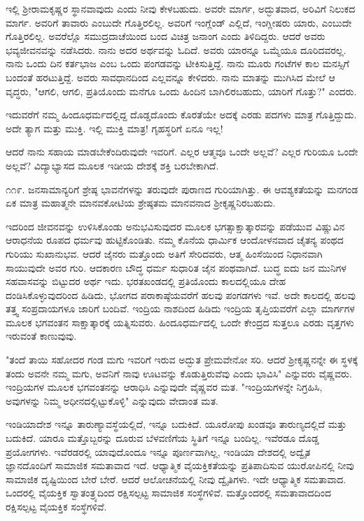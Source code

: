 ಇಲ್ಲಿ ಶ‍್ರೀರಾಮಕೃಷ್ಣರ ಸ್ಥಾನವಾವುದು ಎಂದು ನೀವು ಕೇಳಬಹುದು. ಅವರೇ ಮಾರ್ಗ, ಅದ್ಭುತವಾದ, ಅರಿವಿಗೆ ನಿಲುಕದ ಮಾರ್ಗ. ಅವರಿಗೆ ತಾವಾರು ಎಂಬುದೇ ಗೊತ್ತಿರಲಿಲ್ಲ. ಅವರಿಗೆ ಇಂಗ್ಲೆಂಡ್ ಎಲ್ಲಿದೆ, ಇಂಗ್ಲೀಷರು ಯಾರು, ಎಂಬುದೇ ಗೊತ್ತಿರಲಿಲ್ಲ. ಅವರೆಲ್ಲೊ ಸಮುದ್ರದಾಚೆಯಿಂದ ಬಂದ ವಿಚಿತ್ರ ಜನಾಂಗ ಎಂದು ತಿಳಿದಿದ್ದರು. ಆದರೆ ಅವರು ಭವ್ಯಜೀವನವನ್ನು ನಡೆಸಿದರು. ನಾನು ಅದರ ಅರ್ಥವನ್ನು ಓದಿದೆ. ಅವರು ಯಾರನ್ನೂ ಒಮ್ಮೆಯೂ ದೂರಿದವರಲ್ಲ. ನಾನು ಒಂದು ದಿನ ಕರ್ತಭಾಜ ಎಂಬ ಒಂದು ಪಂಗಡವನ್ನು ಟೀಕಿಸುತ್ತಿದ್ದೆ. ನಾನು ಮೂರು ಗಂಟೆಗಳ ಕಾಲ ಮನಸ್ಸಿಗೆ ಬಂದಂತೆ ಹರಟುತ್ತಿದ್ದೆ. ಅವರು ಸಾವಧಾನದಿಂದ ಎಲ್ಲವನ್ನೂ ಕೇಳಿದರು. ನಾನು ಮಾತನ್ನು ಮುಗಿಸಿದ ಮೇಲೆ ಆ ವೃದ್ಧರು, "ಆಗಲಿ, ಆಗಲಿ, ಪ್ರತಿಯೊಂದು ಮನೆಗೂ ಒಂದು ಹಿಂದಿನ ಬಾಗಿಲಿರಬಹುದು, ಯಾರಿಗೆ ಗೊತ್ತು?" ಎಂದರು.

ಇದುವರೆಗೆ ನಮ್ಮ ಹಿಂದೂಧರ್ಮದಲ್ಲಿದ್ದ ದೊಡ್ಡದೊಂದು ಕೊರತೆಯೇ ಅದಕ್ಕೆ ಎರಡು ಪದಗಳು ಮಾತ್ರ ಗೊತ್ತಿದ್ದುದು. ಅದೇ ತ್ಯಾಗ ಮತ್ತು ಮುಕ್ತಿ. ಇಲ್ಲಿ ಮುಕ್ತಿ ಮಾತ್ರ! ಗೃಹಸ್ಥರಿಗೆ ಏನೂ ಇಲ್ಲ!

ಆದರೆ ನಾನು ಸಹಾಯ ಮಾಡಬೇಕೆಂದಿರುವುದೇ ಇವರಿಗೆ. ಎಲ್ಲರ ಆತ್ಮವೂ ಒಂದೇ ಅಲ್ಲವೆ? ಎಲ್ಲರ ಗುರಿಯೂ ಒಂದೇ ಅಲ್ಲವೆ? ವಿದ್ಯಾಭ್ಯಾಸದ ಮೂಲಕ ಇಡೀಯ ದೇಶಕ್ಕೆ ಶಕ್ತಿ ಬರಬೇಕಾಗಿದೆ.

೧೧೯. ಜನಸಾಮಾನ್ಯರಿಗೆ ಶ್ರೇಷ್ಠ ಭಾವನೆಗಳನ್ನು ತರುವುದೇ ಪುರಾಣದ ಗುರಿಯಾಗಿತ್ತು. ಈ ಆವಶ್ಯಕತೆಯನ್ನು ಮನಗಂಡ ಏಕ ಮಾತ್ರ ಮಹಾತ್ಮನೇ ಮಾನವಕೋಟಿಯ ಶ್ರೇಷ್ಠತಮ ಮಾನವನಾದ ಶ‍್ರೀಕೃಷ್ಣನಿರಬಹುದು.

ಇದರಿಂದ ಜೀವನವನ್ನು ಉಳಿಸಿಕೊಂಡು ಅನುಭವಿಸುವುದರ ಮೂಲಕ ಭಗತ್ಸಾಕ್ಷಾತ್ಕಾರವನ್ನು ಪಡೆಯುವ ವಿಷ್ಣುವಿನ ಆರಾಧನೆಯ ರೂಪದ ಧರ್ಮವು ಹುಟ್ಟಿಕೊಂಡಿತು. ನಮ್ಮ ಕೊನೆಯ ಧಾರ್ಮಿಕ ಆಂದೋಳನವಾದ ಚೈತನ್ಯ ಪಂಥದ ಗುರಿಯು ಸುಖಾನುಭವ. ಆದರೆ ಜೈನರು ಮತ್ತೊಂದು ಅತಿಗೆ ಸೇರಿದವರು, ಆತ್ಮ ಹಿಂಸೆಯಿಂದ ನಿಧಾನವಾಗಿ ಸಾಯುವುದೇ ಅವರ ಗುರಿ. ಆದಕಾರಣ ಬೌದ್ಧ ಧರ್ಮ ಸುಧಾರಿತ ಜೈನ ಪಂಥವಾಗಿದೆ. ಬುದ್ಧ ಐದು ಜನ ಮುನಿಗಳ ಸಹವಾಸವನ್ನು ಬಿಟ್ಟುದರ ಅರ್ಥ ಇದು. ಭರತಖಂಡದಲ್ಲಿ ಪ್ರತಿಯೊಂದು ಕಾಲದಲ್ಲಿಯೂ ದೇಹ ದಂಡಿಸಿಕೊಳ್ಳುವುದರಿಂದ ಹಿಡಿದು, ಭೋಗದ ಪರಾಕಾಷ್ಠೆಯವರೆಗೆ ಹಲವು ಪಂಗಡಗಳು ಇವೆ. ಅದೇ ಕಾಲದಲ್ಲಿ ಹಲವು ತತ್ತ್ವ ಸಂಪ್ರದಾಯಗಳೂ ಜಾರಿಗೆ ಬಂದಿವೆ. ಇಂದ್ರಿಯ ನಾಶದಿಂದ ಹಿಡಿದು ಇಂದ್ರಿಯ ತೃಪ್ತಿಯವರೆಗೆ ಎಲ್ಲಾ ಮಾರ್ಗಗಳ ಮೂಲಕ ಭಗವಂತನ ಸಾಕ್ಷಾತ್ಕಾರಕ್ಕೆ ಯತ್ನಿಸುವರು. ಹಿಂದೂಧರ್ಮದಲ್ಲಿ ಒಂದೇ ಕೇಂದ್ರದ ಸುತ್ತಲೂ ಎರಡು ವೃತ್ತಗಳು ಇರುವಂತೆ ಕಾಣುವುವು.

"ತಂದೆ ತಾಯಿ ಸಹೋದರ ಗಂಡ ಮಗು ಇವರಿಗೆ ಇರುವ ಅದ್ಭುತ ಪ್ರೇಮವೇನೋ ಸರಿ. ಆದರೆ ಶ‍್ರೀಕೃಷ್ಣನನ್ನೇ ಈ ಸ್ಥಳಕ್ಕೆ ತಂದು ಅವನೇ ನಮ್ಮ ಮಗು, ಅವನಿಗೆ ನಾವು ಊಟವನ್ನು ಕೊಡುತ್ತಿರುವೆವು ಎಂದು ಭಾವಿಸಿ" ಎನ್ನುವರು ವೈಷ್ಣವರು. ಇಂದ್ರಿಯಗಳ ಮೂಲಕ ಭಗವಂತನನ್ನು ಆರಾಧಿಸಿ ಎನ್ನುವುದೇ ವೈಷ್ಣವರ ಮತ. "ಇಂದ್ರಿಯಗಳನ್ನೇ ನಿಗ್ರಹಿಸಿ, ಅವುಗಳನ್ನು ನಿಮ್ಮ ಅಧೀನದಲ್ಲಿಟ್ಟುಕೊಳ್ಳಿ" ಎನ್ನುವುದು ವೇದಾಂತ ಮತ.

ಇಂಡಿಯಾದೇಶ ಇನ್ನೂ ತಾರುಣ್ಯಾವಸ್ಥೆಯಲ್ಲಿದೆ, ಇನ್ನೂ ಬದುಕಿದೆ. ಯೂರೋಪು ಖಂಡವೂ ತಾರುಣ್ಯದಲ್ಲಿದೆ ಮತ್ತು ಬದುಕಿದೆ. ಯಾರೂ ಮತ್ತೊಬ್ಬರನ್ನು ದೂರುವ ಬೆಳವಣಿಗೆಯ ಸ್ಥಿತಿಗೆ ಇನ್ನೂ ಬಂದಿಲ್ಲ. ಇವೆರಡೂ ದೊಡ್ಡ ಪ್ರಯೋಗಗಳು. ಇವೆರಡರಲ್ಲಿ ಯಾವುದೊಂದೂ ಇನ್ನೂ ಪೂರ್ಣವಾಗಿಲ್ಲ, ಇಂಡಿಯಾ ದೇಶದಲ್ಲಿ ಅದ್ವೈತ ಜ್ಞಾನದೊಂದಿಗೆ ಸಾಮಾಜಿಕ ಸಮತಾವಾದ ಇದೆ. ಆಧ್ಯಾತ್ಮಿಕ ವೈಯಕ್ತಿಕತೆಯನ್ನು ಪ್ರತಿಪಾದಿಸುವ ಯುರೋಪಿನಲ್ಲಿ ನೀವು ಸಾಮಾಜಿಕ ದೃಷ್ಟಿಯಿಂದ ಬೇರೆ ಬೇರೆ. ಆದರೆ ಆಲೋಚನೆಯಲ್ಲಿ ನೀವು ದ್ವೈತಿಗಳು. ಇದೇ ಆಧ್ಯಾತ್ಮಿಕ ಸಮತಾವಾದ. ಒಂದರಲ್ಲಿ ವೈಯಕ್ತಿಕ ಸ್ವಾತಂತ್ರ್ಯದಿಂದ ರಕ್ಷಿಸಲ್ಪಟ್ಟ ಸಾಮಾಜಿಕ ಸಂಸ್ಥೆಗಳಿವೆ. ಮತ್ತೊಂದರಲ್ಲಿ ಸಮತಾವಾದದಿಂದ ರಕ್ಷಿಸಲ್ಪಟ್ಟ ವೈಯಕ್ತಿಕ ಸಂಸ್ಥೆಗಳಿವೆ.

